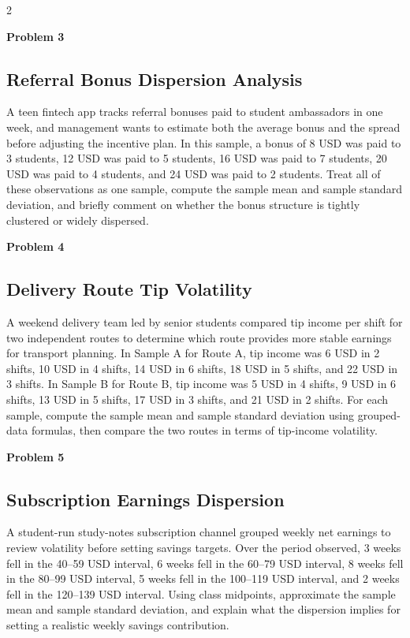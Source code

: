 \documentclass[12pt]{article}
\newcommand{\SubsectionBox}[1]{%
\noindent\colorbox{gray!30}{\parbox{\linewidth}{\textbf{#1}}}\par\vspace{0.35cm}%
}
\begin{document}
\begin{multicols}{2}
\vspace{0.5cm}
\SubsectionBox{Problem 3}
\subsection*{Referral Bonus Dispersion Analysis}
A teen fintech app tracks referral bonuses paid to student ambassadors in one week, and management wants to estimate both the average bonus and the spread before adjusting the incentive plan. In this sample, a bonus of 8 USD was paid to 3 students, 12 USD was paid to 5 students, 16 USD was paid to 7 students, 20 USD was paid to 4 students, and 24 USD was paid to 2 students. Treat all of these observations as one sample, compute the sample mean and sample standard deviation, and briefly comment on whether the bonus structure is tightly clustered or widely dispersed.

\vspace{0.5cm}
\SubsectionBox{Problem 4}
\subsection*{Delivery Route Tip Volatility}
A weekend delivery team led by senior students compared tip income per shift for two independent routes to determine which route provides more stable earnings for transport planning. In Sample A for Route A, tip income was 6 USD in 2 shifts, 10 USD in 4 shifts, 14 USD in 6 shifts, 18 USD in 5 shifts, and 22 USD in 3 shifts. In Sample B for Route B, tip income was 5 USD in 4 shifts, 9 USD in 6 shifts, 13 USD in 5 shifts, 17 USD in 3 shifts, and 21 USD in 2 shifts. For each sample, compute the sample mean and sample standard deviation using grouped-data formulas, then compare the two routes in terms of tip-income volatility.

\vspace{0.5cm}
\SubsectionBox{Problem 5}
\subsection*{Subscription Earnings Dispersion}
A student-run study-notes subscription channel grouped weekly net earnings to review volatility before setting savings targets. Over the period observed, 3 weeks fell in the 40--59 USD interval, 6 weeks fell in the 60--79 USD interval, 8 weeks fell in the 80--99 USD interval, 5 weeks fell in the 100--119 USD interval, and 2 weeks fell in the 120--139 USD interval. Using class midpoints, approximate the sample mean and sample standard deviation, and explain what the dispersion implies for setting a realistic weekly savings contribution.


\end{multicols}
\end{document}
